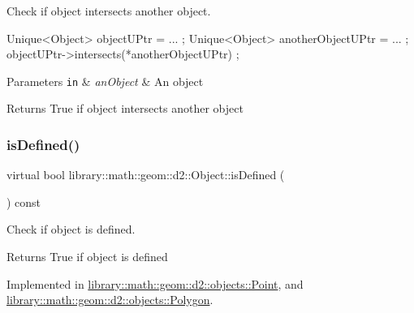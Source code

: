 Check if object intersects another object. 


\begin{DoxyCode}
Unique<Object> objectUPtr = ... ;
Unique<Object> anotherObjectUPtr = ... ;
objectUPtr->intersects(*anotherObjectUPtr) ;
\end{DoxyCode}



\begin{DoxyParams}[1]{Parameters}
\mbox{\tt in}  & {\em an\+Object} & An object \\
\hline
\end{DoxyParams}
\begin{DoxyReturn}{Returns}
True if object intersects another object 
\end{DoxyReturn}
\mbox{\label{classlibrary_1_1math_1_1geom_1_1d2_1_1_object_ae9506254971168a3ca63e1923556b70d}} 
\subsubsection{\texorpdfstring{is\+Defined()}{isDefined()}}
{\footnotesize\ttfamily virtual bool library\+::math\+::geom\+::d2\+::\+Object\+::is\+Defined (\begin{DoxyParamCaption}{ }\end{DoxyParamCaption}) const\hspace{0.3cm}{\ttfamily [pure virtual]}}



Check if object is defined. 

\begin{DoxyReturn}{Returns}
True if object is defined 
\end{DoxyReturn}


Implemented in \hyperlink{classlibrary_1_1math_1_1geom_1_1d2_1_1objects_1_1_point_ac90251968d8eb11df82e28f6cf095e5c}{library\+::math\+::geom\+::d2\+::objects\+::\+Point}, and \hyperlink{classlibrary_1_1math_1_1geom_1_1d2_1_1objects_1_1_polygon_a83e0962f91f0732048e156ad634faaea}{library\+::math\+::geom\+::d2\+::objects\+::\+Polygon}.

\mbox{\label{classlibrary_1_1math_1_1geom_1_1d2_1_1_object_a538fa27124314cddf9705cf35a3efc08}} 
